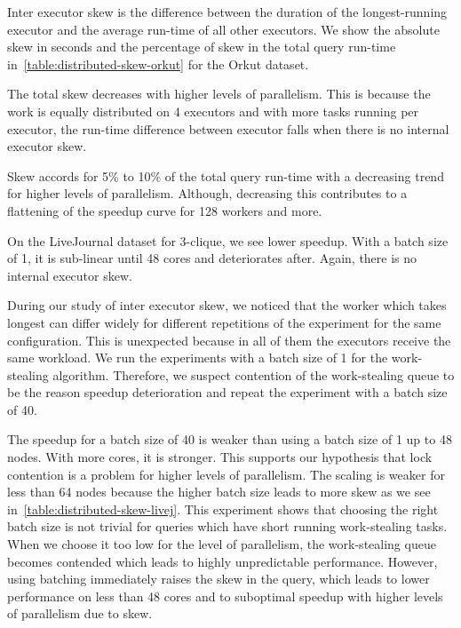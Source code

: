 Inter executor skew is the difference between the duration of the longest-running executor and the average
run-time of all other executors.
We show the absolute skew in seconds and the percentage of skew in the total query run-time
in~\cref{table:distributed-skew-orkut} for the Orkut dataset.

The total skew decreases with higher levels of parallelism.
This is because the work is equally distributed on 4 executors and with more tasks running per executor,
the run-time difference between executor falls when there is no internal executor skew.

Skew accords for 5\% to 10\% of the total query run-time with a decreasing trend for higher levels of
parallelism.
Although, decreasing this contributes to a flattening of the speedup curve for 128 workers and more.

On the LiveJournal dataset for 3-clique, we see lower speedup.
With a batch size of 1, it is sub-linear until 48 cores and deteriorates after.
Again, there is no internal executor skew.

During our study of inter executor skew, we noticed that the worker which takes longest can differ widely
for different repetitions of the experiment for the same configuration.
This is unexpected because in all of them the executors receive the same workload.
We run the experiments with a batch size of 1 for the work-stealing algorithm.
Therefore, we suspect contention of the work-stealing queue to be the reason speedup deterioration and
repeat the experiment with a batch size of 40.

The speedup for a batch size of 40 is weaker than using a batch size of 1 up to 48 nodes.
With more cores, it is stronger.
This supports our hypothesis that lock contention is a problem for higher levels of parallelism.
The scaling is weaker for less than 64 nodes because the higher batch size leads to more skew as we see
in~\cref{table:distributed-skew-livej}.
This experiment shows that choosing the right batch size is not trivial for queries which have
short running work-stealing tasks.
When we choose it too low for the level of parallelism, the work-stealing queue becomes contended which leads
to highly unpredictable performance.
However, using batching immediately raises the skew in the query, which leads to lower performance on less
than 48 cores and to suboptimal speedup with higher levels of parallelism due to skew.

